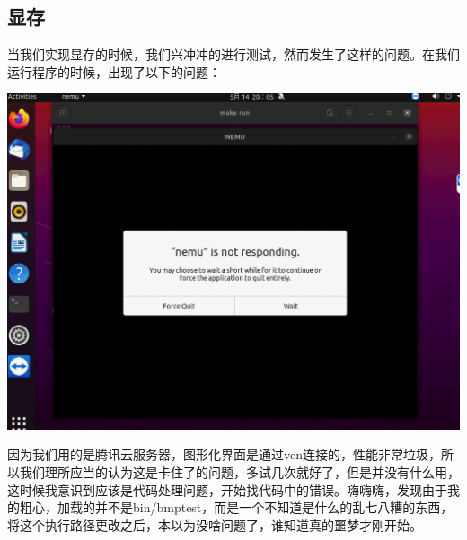 \documentclass[UTF8,a4paper,10pt]{ctexart}
\begin{document}
\subsection{显存}
当我们实现显存的时候，我们兴冲冲的进行测试，然而发生了这样的问题。在我们运行程序的时候，出现了以下的问题：
\begin{center}
  \includegraphics*[scale = 0.25]{pic/baocuo}
\end{center}
因为我们用的是腾讯云服务器，图形化界面是通过vcn连接的，性能非常垃圾，所以我们理所应当的认为这是卡住了的问题，多试几次就好了，但是并没有什么用，这时候我意识到应该是代码处理问题，开始找代码中的错误。嗨嗨嗨，发现由于我的粗心，加载的并不是bin/bmptest，而是一个不知道是什么的乱七八糟的东西，将这个执行路径更改之后，本以为没啥问题了，谁知道真的噩梦才刚开始。
\end{document}
